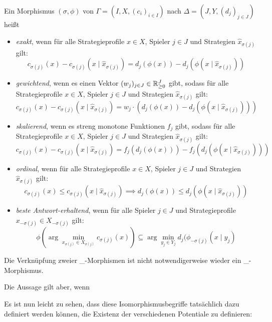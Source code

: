 \begin{defn}\label{def:PotentialMorphismen}
	Ein Morphismus $(\sigma, \phi)$ von $\Gamma = (I, X, (c_i)_{i\in I})$ nach $\Delta = (J, Y, (d_j)_{j\in J})$ heißt
	\begin{itemize}
		\item \emph{exakt}, wenn für alle Strategieprofile $x \in X$, Spieler $j \in J$ und Strategien $\hat{x}_{\sigma(j)}$ gilt:
		\[c_{\sigma(j)}(x) - c_{\sigma(j)}(x \mid \hat{x}_{\sigma(j)}) = d_j(\phi(x)) - d_j(\phi(x \mid \hat{x}_{\sigma(j)}))\]
		\item \emph{gewichtend}, wenn es einen Vektor $(w_j)_{j \in J} \in \mathbb{R}_{\geq 0}^J$ gibt, sodass für alle Strategieprofile $x \in X$, Spieler $j \in J$ und Strategien $\hat{x}_{\sigma(j)}$ gilt:
		\[c_{\sigma(j)}(x) - c_{\sigma(j)}(x \mid \hat{x}_{\sigma(j)}) = w_j\cdot\left(d_j(\phi(x)) - d_j(\phi(x \mid \hat{x}_{\sigma(j)}))\right)\]
		\item \emph{skalierend}, wenn es streng monotone Funktionen $f_j$ gibt, sodass für alle Strategieprofile $x \in X$, Spieler $j \in J$ und Strategien $\hat{x}_{\sigma(j)}$ gilt:
		\[c_{\sigma(j)}(x) - c_{\sigma(j)}(x \mid \hat{x}_{\sigma(j)}) = f_j(d_j(\phi(x))) - f_j(d_j(\phi(x \mid \hat{x}_{\sigma(j)})))\]
		\item \emph{ordinal}, wenn für alle Strategieprofile $x \in X$, Spieler $j \in J$ und Strategien $\hat{x}_{\sigma(j)}$ gilt:
		\[c_{\sigma(j)}(x) \leq c_{\sigma(j)}(x \mid \hat{x}_{\sigma(j)}) \implies d_j(\phi(x)) \leq d_j(\phi(x \mid \hat{x}_{\sigma(j)}))\]
		\item \emph{beste Antwort-erhaltend}, wenn für alle Spieler $j \in J$ und Strategieprofile $x_{-\sigma(j)} \in X_{-\sigma(j)}$ gilt:
		\[\phi(\arg \min_{x_{\sigma(j)} \in X_{\sigma(j)}}c_{\sigma(j)}(x)) \subseteq \arg \min_{y_j \in Y_j} d_j(\phi_{-\sigma(j)}(x \mid y_j)\]
	\end{itemize}	
\end{defn}

\begin{beob}
	Die Verknüpfung zweier \_-Morphismen ist nicht notwendigerweise wieder ein \_-Morphismus. 
	
	
	Die Aussage gilt aber, wenn 
	
\end{beob}

Es ist nun leicht zu sehen, dass diese Isomorphismusbegriffe tatsächlich dazu definiert werden können, die Existenz der verschiedenen Potentiale zu definieren:

